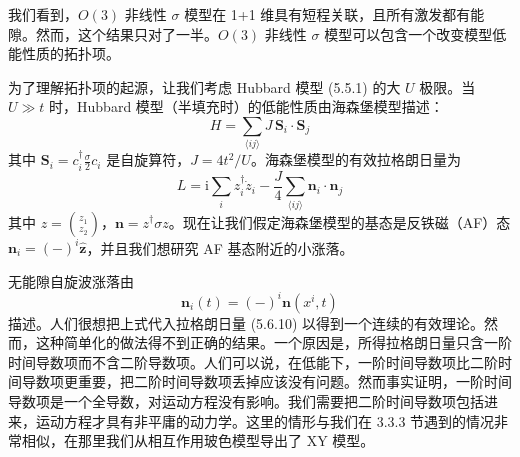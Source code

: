 我们看到，$O(3)$ 非线性 $\sigma$ 模型在 1+1 维具有短程关联，且所有激发都有能隙。然而，这个结果只对了一半。$O(3)$ 非线性 $\sigma$ 模型可以包含一个改变模型低能性质的拓扑项。

为了理解拓扑项的起源，让我们考虑 Hubbard 模型 (5.5.1) 的大 $U$ 极限。当 $U\gg t$ 时，Hubbard 模型（半填充时）的低能性质由海森堡模型描述：
\begin{equation*}
H=\sum_{\langle ij\rangle}J\,\pmb{S}_{i}\cdot\pmb{S}_{j} \tag{5.6.9}
\end{equation*}
其中 $\pmb{S}_{i}=c^{\dagger}_{i}\frac{\sigma}{2}c_{i}$ 是自旋算符，$J=4t^{2}/U$。海森堡模型的有效拉格朗日量为
\begin{equation*}
L=\mathrm{i}\sum_{i}z^{\dagger}_{i}\dot{z}_{i}-\frac{J}{4}\sum_{\langle ij\rangle}\pmb{n}_{i}\cdot\pmb{n}_{j} \tag{5.6.10}
\end{equation*}
其中 $z=\binom{z_{1}}{z_{2}}$，$\pmb{n}=z^{\dagger}\sigma z$。现在让我们假定海森堡模型的基态是反铁磁（AF）态 $\pmb{n}_{i}=(-)^{i}\hat{\pmb{z}}$，并且我们想研究 AF 基态附近的小涨落。

无能隙自旋波涨落由
\begin{equation*}
\pmb{n}_{i}(t)=(-)^{i}\pmb{n}(x^{i},t)
\end{equation*}
描述。人们很想把上式代入拉格朗日量 (5.6.10) 以得到一个连续的有效理论。然而，这种简单化的做法得不到正确的结果。一个原因是，所得拉格朗日量只含一阶时间导数项而不含二阶导数项。人们可以说，在低能下，一阶时间导数项比二阶时间导数项更重要，把二阶时间导数项丢掉应该没有问题。然而事实证明，一阶时间导数项是一个全导数，对运动方程没有影响。我们需要把二阶时间导数项包括进来，运动方程才具有非平庸的动力学。这里的情形与我们在 3.3.3 节遇到的情况非常相似，在那里我们从相互作用玻色模型导出了 XY 模型。

